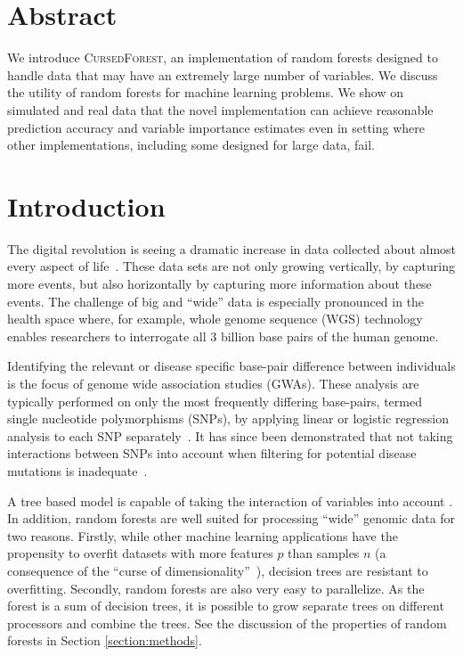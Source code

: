 \documentclass[10pt,letterpaper]{article}
\newcommand{\cursedforest}{\textsc{CursedForest}\xspace}
\begin{document}
\clearpage

\section{Abstract}
We introduce \cursedforest, an implementation of random forests designed to handle data that may have an extremely large
number of variables. We discuss the utility of random forests for machine learning problems. We show on simulated and
real data that the novel implementation can achieve reasonable prediction accuracy and variable importance estimates
even in setting where other implementations, including some designed for large data, fail.

\linenumbers

\section{Introduction}
The digital revolution is seeing a dramatic increase in data collected about almost every aspect of
life~\cite{Loebbecke2015}.  These data sets are not only growing vertically, by capturing more events, but also
horizontally by capturing more information about these events.  The challenge of big and ``wide'' data is especially
pronounced in the health space where, for example, whole genome sequence (WGS) technology enables researchers to
interrogate all 3 billion base pairs of the human genome.

Identifying the relevant or disease specific base-pair difference between individuals is the focus of genome wide
association studies (GWAs).  These analysis are typically performed on only the most frequently differing base-pairs,
termed single nucleotide polymorphisms (SNPs), by applying linear or logistic regression analysis to each SNP
separately~\cite{CCC2007}.  It has since been demonstrated that not taking interactions between SNPs into account
when filtering for potential disease mutations is inadequate~\cite{Manolio2009,Yang2011}.

A tree based model is capable of taking the interaction of variables into account \cite{Wright.et.al.2016}. In addition, random forests are well
suited for processing ``wide'' genomic data for two reasons.  Firstly, while other machine learning applications have
the propensity to overfit datasets with more features $p$ than samples $n$ (a consequence of the ``curse of
dimensionality''~\cite{Bauer2014, bellman1961adaptive}), decision trees are resistant to overfitting.  Secondly, random
forests are also very easy to parallelize. As the forest is a sum of decision trees, it is possible to grow separate
trees on different processors and combine the trees. See the discussion of the properties of random forests in Section
\ref{section:methods}.
\end{document}

